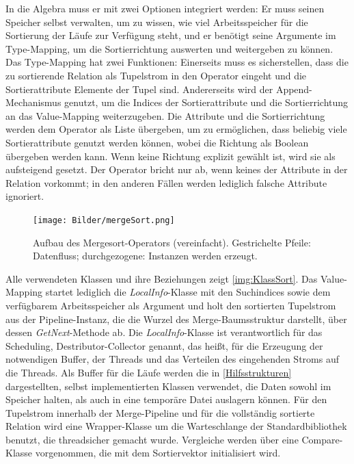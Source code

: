 \documentclass[a4paper,12pt,twoside]{article}
\newcommand{\Fb}[1]{\textit{#1}} %
\begin{document}
In die Algebra muss er mit zwei Optionen integriert werden: Er muss seinen Speicher selbst verwalten, um zu wissen, wie viel Arbeitsspeicher für die Sortierung der Läufe zur Verfügung steht, und er benötigt seine Argumente im Type-Mapping, um die Sortierrichtung auswerten und weitergeben zu können. Das Type-Mapping hat zwei Funktionen: Einerseits muss es sicherstellen, dass die zu sortierende Relation als Tupelstrom in den Operator eingeht und die Sortierattribute Elemente der Tupel sind. Andererseits wird der Append-Mechanismus genutzt, um die Indices der Sortierattribute und die Sortierrichtung an das Value-Mapping weiterzugeben. Die Attribute und die Sortierrichtung werden dem Operator als Liste übergeben, um zu ermöglichen, dass beliebig viele Sortierattribute genutzt werden können, wobei die Richtung als Boolean übergeben werden kann. Wenn keine Richtung explizit gewählt ist, wird sie als aufsteigend gesetzt. Der Operator bricht nur ab, wenn keines der Attribute in der Relation vorkommt; in den anderen Fällen werden lediglich falsche Attribute ignoriert. 

\begin{figure}
	\centering
	\texttt{[image: Bilder/mergeSort.png]}
	\caption{Aufbau des Mergesort-Operators (vereinfacht). Gestrichelte Pfeile: Datenfluss; durchgezogene: Instanzen werden erzeugt.}
	\label{img:KlassSort}
\end{figure}

Alle verwendeten Klassen und ihre Beziehungen zeigt \autoref{img:KlassSort}. Das Value-Mapping startet lediglich die \Fb{LocalInfo}-Klasse mit den Suchindices sowie dem verfügbarem Arbeitsspeicher als Argument und holt den sortierten Tupelstrom aus der Pipeline-Instanz, die die Wurzel des Merge-Baumsstruktur darstellt, über dessen \Fb{GetNext}-Methode ab. Die \Fb{LocalInfo}-Klasse ist verantwortlich für das Scheduling, Destributor-Collector genannt, das heißt, für die Erzeugung der notwendigen Buffer, der Threads und das Verteilen des eingehenden Stroms auf die Threads. Als Buffer für die Läufe werden die in \autoref{Hilfsstrukturen} dargestellten, selbst implementierten Klassen verwendet, die Daten sowohl im Speicher halten, als auch in eine temporäre Datei auslagern können. Für den Tupelstrom innerhalb der Merge-Pipeline und für die vollständig sortierte Relation wird eine Wrapper-Klasse um die Warteschlange der Standardbibliothek benutzt, die threadsicher gemacht wurde. Vergleiche werden über eine Compare-Klasse vorgenommen, die mit dem Sortiervektor initialisiert wird.
\end{document}
